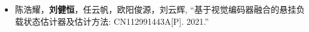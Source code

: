 %
%



\begin{itemize}
	\item 陈浩耀，\textbf{刘健恒}，任云帆，欧阳俊源，刘云辉, ``基于视觉编码器融合的悬挂负载状态估计器及估计方法: CN112991443A[P]. 2021.''\\
	\vspace{-8pt}
\end{itemize}